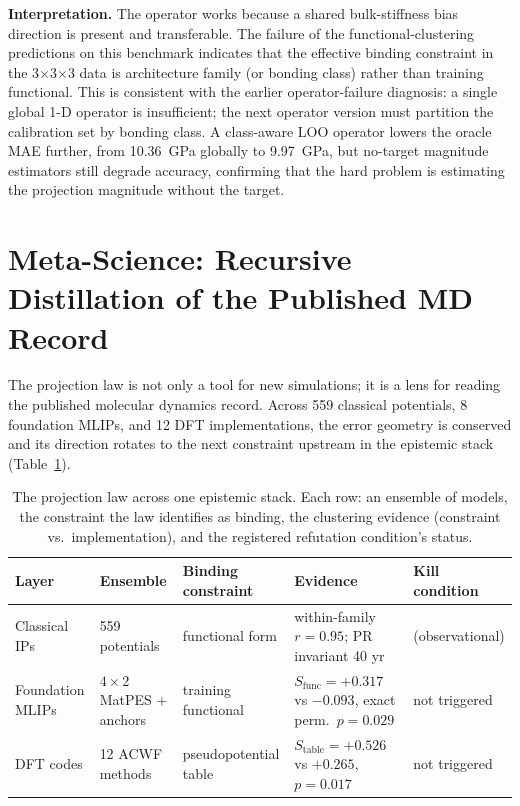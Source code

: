 \documentclass[11pt]{article}
\begin{document}
\textbf{Interpretation.} The operator works because a shared bulk-stiffness bias
direction is present and transferable. The failure of the functional-clustering
predictions on this benchmark indicates that the effective binding constraint in
the 3$\times$3$\times$3 data is architecture family (or bonding class) rather
than training functional. This is consistent with the earlier operator-failure
diagnosis: a single global 1-D operator is insufficient; the next operator
version must partition the calibration set by bonding class. A class-aware LOO
operator lowers the oracle MAE further, from 10.36~GPa globally to 9.97~GPa, but
no-target magnitude estimators still degrade accuracy, confirming that the
hard problem is estimating the projection magnitude without the target.

\section{Meta-Science: Recursive Distillation of the Published MD Record}
\label{sec:metascience}

The projection law is not only a tool for new simulations; it is a lens for
reading the published molecular dynamics record. Across 559 classical
potentials, 8 foundation MLIPs, and 12 DFT implementations, the error
geometry is conserved and its direction rotates to the next constraint upstream
in the epistemic stack (Table~\ref{tab:layers}).

\begin{table}[t]
\centering
\caption{The projection law across one epistemic stack. Each row: an ensemble
of models, the constraint the law identifies as binding, the clustering
evidence (constraint vs.\ implementation), and the registered refutation
condition's status.}
\label{tab:layers}
\small
\begin{tabularx}{\textwidth}{@{}l l l X l@{}}
\toprule
Layer & Ensemble & Binding constraint & Evidence & Kill condition \\
\midrule
Classical IPs & 559 potentials & functional form & within-family $r{=}0.95$; PR invariant 40 yr & (observational) \\
Foundation MLIPs & $4{\times}2$ MatPES $+$ anchors & training functional & $S_{\mathrm{func}}{=}{+}0.317$ vs ${-}0.093$, exact perm.\ $p{=}0.029$ & not triggered \\
DFT codes & 12 ACWF methods & pseudopotential table & $S_{\mathrm{table}}{=}{+}0.526$ vs ${+}0.265$, $p{=}0.017$ & not triggered \\
\bottomrule
\end{tabularx}
\end{table}
\end{document}
